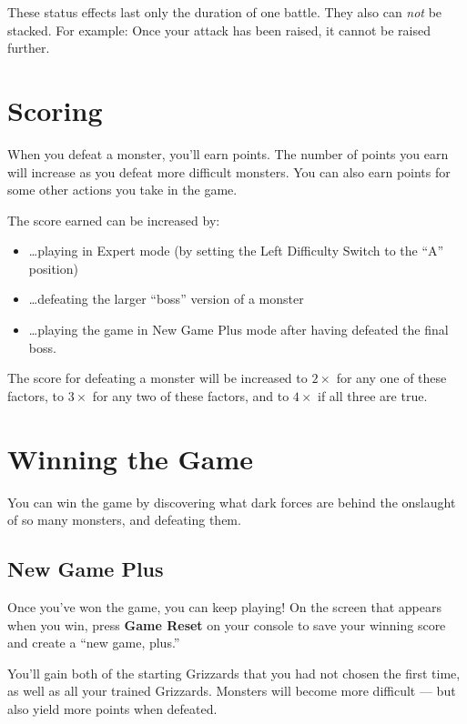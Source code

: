 \documentclass[10pt,twocolumn,openany,article]{memoir}
\begin{document}
These status effects last only the duration of one battle. They also can
\emph{not} be stacked. For example: Once your attack has been raised, it
cannot be raised further.

\section{Scoring}

When you defeat a monster, you'll  earn points. The number of points you
earn will increase  as you defeat more difficult monsters.  You can also
earn points for some other actions you take in the game.

The score earned can be increased by:

\begin{itemize}
\item \ldots{}playing  in Expert  mode (by  setting the  Left Difficulty
  Switch to the ``A'' position)
\item \ldots{}defeating the larger ``boss'' version of a monster
\item  \ldots{}playing the  game  in  New Game  Plus  mode after  having
  defeated the final boss.
\end{itemize}

The score for  defeating a monster will be increased  to $2\times$ for any
one of these  factors, to $3\times$ for  any two of these  factors, and to
$4\times$ if all three are true.

\section{Winning the Game}

You can  win the  game by  discovering what dark  forces are  behind the
onslaught of so many monsters, and defeating them.

\subsection*{New Game Plus}\label{sec:NewGamePlus}

Once  you've won  the game,  you can  keep playing!  On the  screen that
appears when you win, press \textbf{Game  Reset} on your console to save
your winning score and create a ``new game, plus.''

You'll gain both  of the starting Grizzards that you  had not chosen the
first time, as well as all  your trained Grizzards. Monsters will become
more difficult — but also yield more points when defeated.
\end{document}
